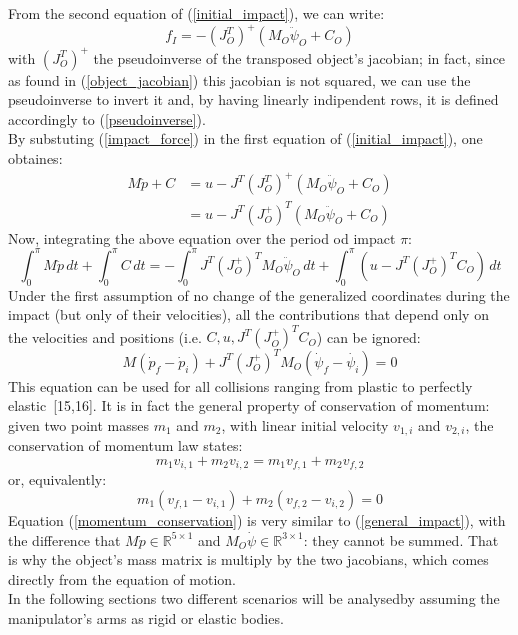 \documentclass[a4paper,12pt,oneside]{report}
\begin{document}
From the second equation of (\ref{initial_impact}), we can write:
\begin{equation}
  f_I=-(J_O^T)^+(M_O\ddot{\psi}_O+C_O)
  \label{impact_force}
\end{equation}
with $(J_O^T)^+$ the pseudoinverse of the transposed object's jacobian; in fact, since as found in (\ref{object_jacobian}) this jacobian is not squared, we can use the pseudoinverse to invert it and, by having linearly indipendent rows, it is defined accordingly to (\ref{pseudoinverse}).\\
By substuting (\ref{impact_force}) in the first equation of (\ref{initial_impact}), one obtaines:
\begin{equation}
  \begin{split}
  M\ddot{p}+C&=u-J^T(J_O^T)^+(M_O\ddot{\psi}_O+C_O)\\
  &=u-J^T(J_O^+)^T(M_O\ddot{\psi}_O+C_O)
  \end{split}
\end{equation}
Now, integrating the above equation over the period od impact $\pi$:
\begin{equation}
  \int_{0}^{\pi}M\ddot{p}\,dt+\int_{0}^{\pi}C\,dt =-\int_{0}^{\pi}J^T(J_O^+)^TM_O\ddot{\psi}_O\,dt+\int_{0}^{\pi}(u-J^T(J_O^+)^TC_O)\,dt
\end{equation}
Under the first assumption of no change of the generalized coordinates during the impact (but only of their velocities), all the contributions that depend only on the velocities and positions (i.e. $C,u,J^T(J_O^+)^TC_O$) can be ignored:
\begin{equation}
  M(\dot{p}_f-\dot{p}_i)+J^T(J_O^+)^TM_O(\dot{\psi}_f-\dot{\psi_i})=0
  \label{general_impact}
\end{equation}
This equation can be used for all collisions ranging from plastic to perfectly elastic~[15,16]. It is in fact the general property of conservation of momentum:  given two point masses $m_1$ and $m_2$, with linear initial velocity $v_{1,i}$ and $v_{2,i}$, the conservation of momentum law states:
\begin{equation}
  m_1v_{i,1}+m_2v_{i,2}=m_1v_{f,1}+m_2v_{f,2}
\end{equation}
or, equivalently:
\begin{equation}
  m_1(v_{f,1}-v_{i,1})+m_2(v_{f,2}-v_{i,2})=0
  \label{momentum_conservation}
\end{equation}
Equation (\ref{momentum_conservation}) is very similar to (\ref{general_impact}), with the difference that $M\dot{p}\in \mathbb{R}^{5\times 1}$ and $M_O\dot{\psi}\in \mathbb{R}^{3\times 1}$: they cannot be summed. That is why the object's mass matrix is multiply by the two jacobians, which comes directly from the equation of motion.\\
In the following sections two different scenarios will be analysedby assuming the manipulator's arms as rigid or elastic bodies.
\newpage
\end{document}
